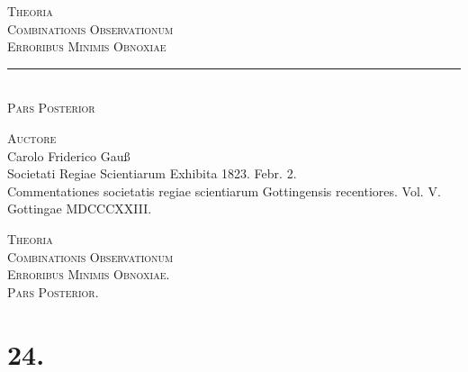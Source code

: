 \documentclass[12pt,a4paper]{book}
\begin{document}
\newpage
\thispagestyle{empty}
\begin{center}
\vspace*{2cm}

{\LARGE\textsc{Theoria}}\\[1em]
{\Large\textsc{Combinationis Observationum}}\\[1em]
{\Large\textsc{Erroribus Minimis Obnoxiae}}\\[2em]

\rule{0.4\textwidth}{0.4pt}\\[1em]

{\large\textsc{Pars Posterior}}\\[2em]

\vspace{1cm}

{\large\textsc{Auctore}}\\[0.5em]
{\large Carolo Friderico Gauß}\\[2em]

{\small Societati Regiae Scientiarum Exhibita 1823. Febr. 2.}\\[1em]
{\footnotesize Commentationes societatis regiae scientiarum Gottingensis recentiores. Vol. V.\\
Gottingae MDCCCXXIII.}

\end{center}

\newpage
\thispagestyle{empty}
\null

\newpage

\begin{center}
{\Large\textsc{Theoria}}\\[0.5em]
{\Large\textsc{Combinationis Observationum}}\\[0.5em]
{\Large\textsc{Erroribus Minimis Obnoxiae.}}\\[1em]
{\large\textsc{Pars Posterior.}}
\end{center}

\vspace{1em}

\section*{24.}
\label{sec:art24}
\end{document}

